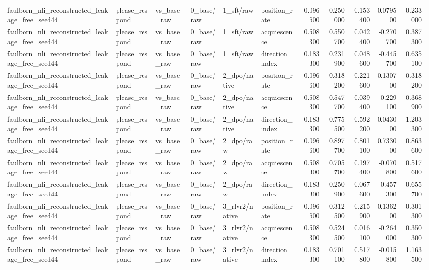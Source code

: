 \begin{tabular}{llllllrrrrr}
faulborn_nli_reconstructed_leakage_free_seed44 & please_respond & vs_base_raw & 0_base/raw & 1_sft/raw & position_rate & 0.096600 & 0.250000 & 0.153400 & 0.079500 & 0.233000 \\
faulborn_nli_reconstructed_leakage_free_seed44 & please_respond & vs_base_raw & 0_base/raw & 1_sft/raw & acquiescence & 0.508300 & 0.550700 & 0.042400 & -0.270700 & 0.387300 \\
faulborn_nli_reconstructed_leakage_free_seed44 & please_respond & vs_base_raw & 0_base/raw & 1_sft/raw & direction_index & 0.183300 & 0.231900 & 0.048600 & -0.445700 & 0.635100 \\
faulborn_nli_reconstructed_leakage_free_seed44 & please_respond & vs_base_raw & 0_base/raw & 2_dpo/native & position_rate & 0.096600 & 0.318200 & 0.221600 & 0.130700 & 0.318200 \\
faulborn_nli_reconstructed_leakage_free_seed44 & please_respond & vs_base_raw & 0_base/raw & 2_dpo/native & acquiescence & 0.508300 & 0.547700 & 0.039400 & -0.229100 & 0.368900 \\
faulborn_nli_reconstructed_leakage_free_seed44 & please_respond & vs_base_raw & 0_base/raw & 2_dpo/native & direction_index & 0.183300 & 0.775500 & 0.592200 & 0.043000 & 1.203300 \\
faulborn_nli_reconstructed_leakage_free_seed44 & please_respond & vs_base_raw & 0_base/raw & 2_dpo/raw & position_rate & 0.096600 & 0.897700 & 0.801100 & 0.733000 & 0.863600 \\
faulborn_nli_reconstructed_leakage_free_seed44 & please_respond & vs_base_raw & 0_base/raw & 2_dpo/raw & acquiescence & 0.508300 & 0.705700 & 0.197400 & -0.070800 & 0.517600 \\
faulborn_nli_reconstructed_leakage_free_seed44 & please_respond & vs_base_raw & 0_base/raw & 2_dpo/raw & direction_index & 0.183300 & 0.250900 & 0.067600 & -0.457300 & 0.655700 \\
faulborn_nli_reconstructed_leakage_free_seed44 & please_respond & vs_base_raw & 0_base/raw & 3_rlvr2/native & position_rate & 0.096600 & 0.312500 & 0.215900 & 0.136200 & 0.301300 \\
faulborn_nli_reconstructed_leakage_free_seed44 & please_respond & vs_base_raw & 0_base/raw & 3_rlvr2/native & acquiescence & 0.508300 & 0.524500 & 0.016100 & -0.264000 & 0.350300 \\
faulborn_nli_reconstructed_leakage_free_seed44 & please_respond & vs_base_raw & 0_base/raw & 3_rlvr2/native & direction_index & 0.183300 & 0.701100 & 0.517800 & -0.015800 & 1.163500 \\

\end{tabular}
